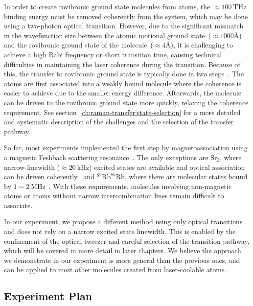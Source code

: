 In order to create rovibronic ground state molecules from atoms,
the $\approx\!100~\mathrm{THz}$ binding energy must be removed coherently from the system,
which may be done using a two-photon optical transition.
However, due to the significant mismatch in the wavefunction size
between the atomic motional ground state~($\approx\!1000\text{\AA}$)
and the rovibronic ground state of the molecule~($\approx\!4\text{\AA}$),
it is challenging to achieve a high Rabi frequency or short transition time,
causing technical difficulties in maintaining the laser coherence during the transition.
Because of this, the transfer to rovibronic ground state is typically done in two steps~\cite{
  danzl_quantum_2008,ni_high_2008,lang_ultracold_2008,takekoshi_ultracold_2014,
  molony_creation_2014,park_ultracold_2015,guo_creation_2016,rvachov_long-lived_2017,
  kondov_molecular_2019,voges_ultracold_2020}.
The atoms are first associated into a weakly bound molecule
where the coherence is easier to achieve due to the smaller energy difference.
Afterwards, the molecule can be driven to the rovibronic ground state more quickly,
relaxing the coherence requirement. See section~\ref{ch:raman-transfer:state-selection}
for a more detailed and systematic description of the challenges
and the selection of the transfer pathway.

So far, most experiments implemented the first step
by magnetoassociation using a magnetic Feshbach scattering resonance~\cite{
  ni_high_2008,zhang_forming_2020}.
The only exceptions are $\mathrm{Sr}_2$,
where narrow-linewidth ($\approx\!20~\mathrm{kHz}$) excited states
are available and optical association can be driven coherently~\cite{
  reinaudi_optical_2012,stellmer_creation_2012}
and $^{87}\mathrm{Rb}^{85}\mathrm{Rb}$,
where there are molecular states bound by $1\sim2~\mathrm{MHz}$~\cite{he_coherently_2020}.
With these requirements, molecules involving non-magnetic atoms
or atoms without narrow intercombination lines remain difficult to associate.

In our experiment, we propose a different method using only optical transitions
and does not rely on a narrow excited state linewidth.
This is enabled by the confinement of the optical tweezer and
careful selection of the transition pathway,
which will be covered in more detail in later chapters.
We believe the approach we demonstrate in our experiment is more general
than the previous ones,
and can be applied to most other molecules created from laser-coolable atoms.

\subsection{Experiment Plan}
\label{ch:introduction:tweezers:plan}

